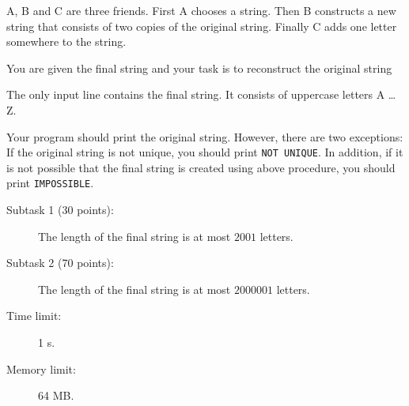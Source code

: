 \documentclass{boi2014}
\begin{document}
    A, B and C are three friends. First A chooses a string. Then
    B constructs a new string that consists of two copies of the original
    string. Finally C adds one letter somewhere to the string.
    

    \Task
    You are given the final string and your task is to reconstruct the original
    string

    \Input
    The only input line contains the final string. It consists of
    uppercase letters A \ldots{} Z.

    \Output
    Your program should print the original string.
    However, there are two exceptions:
    If the original string is not unique, you should print {\tt NOT UNIQUE}.
    In addition, if it is not possible that the final string
    is created using above procedure, you should print {\tt IMPOSSIBLE}.
    

    \Examples


    \Scoring

    \begin{description}
        \item[Subtask 1 (30 points):] The length of the final string is at
        most $2001$ letters.
        \item[Subtask 2 (70 points):] The length of the final string is at
        most $2000001$ letters.
    \end{description}

    \Constraints

    \begin{description}
        \item[Time limit:] 1 s.
        \item[Memory limit:] 64 MB.
    \end{description}
\end{document}
